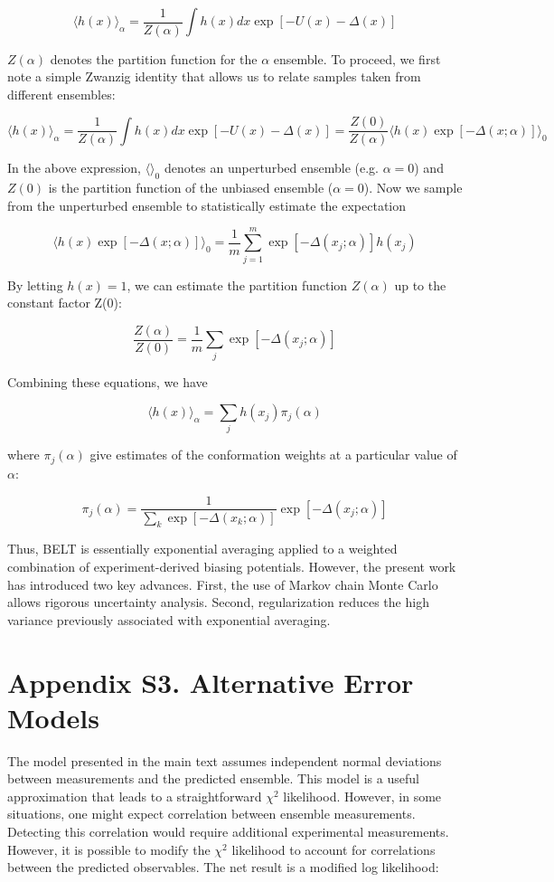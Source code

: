 \documentclass[12pt]{article}
\begin{document}
$$\langle h(x)\rangle _\alpha = \frac{1}{Z(\alpha)} \int h(x) dx \exp[ -U(x) - \Delta(x)]$$

$Z(\alpha)$ denotes the partition function for the $\alpha$ ensemble.  To proceed, we first note a simple Zwanzig identity that allows us to relate samples taken from different ensembles:

$$\langle h(x)\rangle _\alpha = \frac{1}{Z(\alpha)} \int h(x) dx \exp[ -U(x) - \Delta(x)] = \frac{Z(0)}{Z(\alpha)} \langle h(x) \exp[-\Delta(x;\alpha)]\rangle _0 $$

In the above expression, $\langle \rangle_0$ denotes an unperturbed ensemble (e.g. $\alpha = 0$) and $Z(0)$ is the partition function of the unbiased ensemble ($\alpha = 0$).  Now we sample from the unperturbed ensemble to statistically estimate the expectation

$$\langle h(x) \exp[-\Delta(x;\alpha)]\rangle _0 = \frac{1}{m} \sum_{j = 1}^{m} \exp [ - \Delta(x_j;\alpha)] h(x_j)$$

By letting $h(x) = 1$, we can estimate the partition function $Z(\alpha)$ up to the constant factor Z(0):

$$ \frac{Z(\alpha)}{Z(0)} = \frac{1}{m} \sum_j \exp[-\Delta(x_j;\alpha)]$$

Combining these equations, we have

$$\langle h(x)\rangle _\alpha = \sum_j h(x_j) \pi_j(\alpha)$$

where $\pi_j(\alpha)$ give estimates of the conformation weights at a particular value of $\alpha$:

$$\pi_j(\alpha) = \frac{1}{\sum_k \exp[-\Delta(x_k;\alpha)]} \exp[-\Delta(x_j;\alpha)]$$

Thus, BELT is essentially exponential averaging applied to a weighted combination of experiment-derived biasing potentials.  However, the present work has introduced two key advances.  First, the use of Markov chain Monte Carlo allows rigorous uncertainty analysis.  Second, regularization reduces the high variance previously associated with exponential averaging.  

\newpage

\section*{Appendix S3.  Alternative Error Models}

The model presented in the main text assumes independent normal deviations between measurements and the predicted ensemble.  This model is a useful approximation that leads to a straightforward $\chi^2$ likelihood.  However, in some situations, one might expect correlation between ensemble measurements.  Detecting this correlation would require additional experimental measurements.  However, it is possible to modify the $\chi^2$ likelihood to account for correlations between the predicted observables.  The net result is a modified log likelihood:
\end{document}
